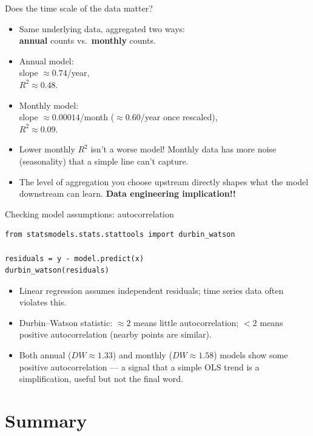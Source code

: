 \documentclass[11pt,aspectratio=43]{beamer}
\begin{document}
\begin{frame}{Does the time scale of the data matter?}
\begin{itemize}
  \item Same underlying data, aggregated two ways:\\ \textbf{annual} counts vs.\ \textbf{monthly} counts.
  \item Annual model:\\ slope $\approx 0.74$/year,\\ $R^2 \approx 0.48$.
  \item Monthly model:\\ slope $\approx 0.00014$/month ($\approx 0.60$/year once rescaled),\\ $R^2 \approx 0.09$.
  \item Lower monthly $R^2$ isn't a worse model! Monthly data has more noise (seasonality) that a simple line can't capture.
  \item The level of aggregation you choose upstream directly shapes what the model downstream can learn. \textbf{Data engineering implication!!}
\end{itemize}
\end{frame}

\begin{frame}[fragile]{Checking model assumptions: autocorrelation}
\begin{lstlisting}
from statsmodels.stats.stattools import durbin_watson

residuals = y - model.predict(x)
durbin_watson(residuals)
\end{lstlisting}
\begin{itemize}
  \item Linear regression assumes independent residuals; time series data often violates this.
  \item Durbin--Watson statistic: $\approx 2$ means little autocorrelation; $<2$ means positive autocorrelation (nearby points are similar).
  \item Both annual ($DW \approx 1.33$) and monthly ($DW \approx 1.58$) models show some positive autocorrelation --- a signal that a simple OLS trend is a simplification, useful but not the final word.
\end{itemize}
\end{frame}

\section{Summary}
\end{document}
